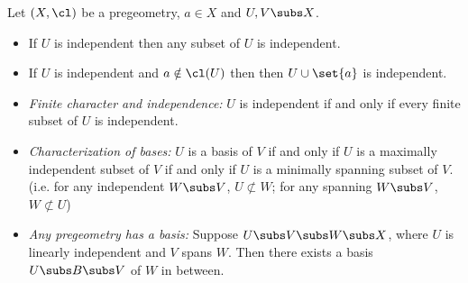 \begin{prop}
    Let $(X,\cl)$ be a pregeometry, $a \in X$ and $U,V \subs X$.
    \begin{itemize}
      \item
        If $U$ is independent then any subset of $U$ is independent.
      \item
        If $U$ is independent and $a \notin \cl(U)$ then then
        $U \cup \set{a}$ is independent.
      \item \textit{Finite character and independence:}
        $U$ is independent if and only if every finite subset of $U$ is
        independent.
      \item \textit{Characterization of bases:}
        $U$ is a basis of $V$ if and only if $U$
        is a maximally independent subset of $V$
        if and only if $U$ is a minimally spanning subset of $V$.
        (i.e. for any independent $W \subs V$, $U \not \subset W$;
        for any spanning $W \subs V$, $W \not \subset U$)
      \item \textit{Any pregeometry has a basis:}
        Suppose $U \subs V \subs W \subs X$,
        where $U$ is linearly independent
        and $V$ spans $W$.
        Then there exists a basis $U \subs B \subs V$ of $W$ in between.
    \end{itemize}
\end{prop}
